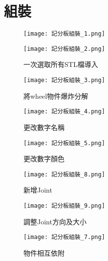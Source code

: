 \section{組裝}
{
\begin{figure}[hbt!]
  \centering
  \texttt{[image: 記分板組裝\_1.png]}
\end{figure}
\begin{figure}[hbt!]
  \centering
  \texttt{[image: 記分板組裝\_2.png]}
  \caption{一次選取所有STL檔導入}
  \label{fig:photo13}
\end{figure}

\begin{figure}[hbt!]
  \begin{center}
    \texttt{[image: 記分板組裝\_3.png]}
  \end{center}
  \caption{將wheel物件爆炸分解}
  \label{fig:photo}
\end{figure}

\begin{figure}[hbt!]
  \begin{center}
    \texttt{[image: 記分板組裝\_4.png]}
  \end{center}
  \caption{更改數字名稱}
  \label{fig:photo}
\end{figure}

\begin{figure}[hbt!]
  \begin{center}
    \texttt{[image: 記分板組裝\_5.png]}
  \end{center}
  \caption{更改數字顏色}
  \label{fig:photo}
\end{figure}

\begin{figure}[hbt!]
  \begin{center}
    \texttt{[image: 記分板組裝\_8.png]}
  \end{center}
  \caption{新增Joint}
  \label{fig:photo}
\end{figure}

\begin{figure}[hbt!]
  \begin{center}
    \texttt{[image: 記分板組裝\_9.png]}
  \end{center}
  \caption{調整Joint方向及大小}
  \label{fig:photo}
\end{figure}

\begin{figure}[hbt!]
  \begin{center}
    \texttt{[image: 記分板組裝\_7.png]}
  \end{center}
  \caption{物件相互依附}
  \label{fig:photo}
\end{figure}

}
